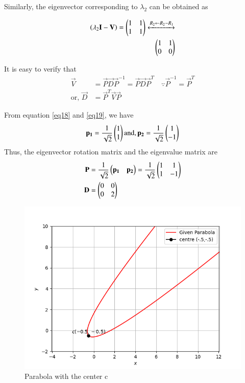 \documentclass[journal,12pt,twocolumn]{IEEEtran}
\begin{document}
  Similarly, the eigenvector corresponding to $\lambda_2$ can be obtained as
  
  \begin{align}
  \left(\lambda_2\mathbf{I}-\mathbf{V}\right)
  = \begin{pmatrix} 1 & 1 \\ 1 & 1\end{pmatrix} 
  \xleftrightarrow{R_2\leftarrow R_2 - R_1} \nonumber   \\
  \begin{pmatrix}
  	1 & 1   \\ 0 & 0 
  \end{pmatrix}
  \label{eq19}
  \end{align}
  
  
  

It is easy to verify that 
\begin{align}
\vec{V} &= \vec{P}\vec{D}\vec{P}^{-1}=\vec{P}\vec{D}\vec{P}^T \quad \because \vec{P}^{-1} = \vec{P}^{T} \label{eq:solutions/41/ex1/ellipse_spectrum_eq}
\\
\text{or, } \vec{D} &= \vec{P}^T\vec{V}\vec{P}
\end{align}


From equation \eqref{eq18} and \eqref{eq19}, we have
\begin{align}
\mathbf{p_1} =  \frac{1}{\sqrt{2}} \begin{pmatrix}1 \\ 1\end{pmatrix} 
\text{and},  \mathbf{p_2} =  \frac{1}{\sqrt{2}} \begin{pmatrix}1 \\ -1\end{pmatrix} 
\end{align}
Thus, the eigenvector rotation matrix and the
eigenvalue matrix are 
\begin{align}
\mathbf{P} &= \frac{1}{\sqrt{2}} \begin{pmatrix} \mathbf{p_1} & \mathbf{p_2}\end{pmatrix} = \frac{1}{\sqrt{2}} \begin{pmatrix} 1 & 1 \\ 1 & -1\end{pmatrix} \\
 \mathbf{D} &= \begin{pmatrix}0 & 0 \\ 0 & 2\end{pmatrix} 
\end{align}

\begin{figure}[htb!]	
	\centering	
	\includegraphics[width=\columnwidth]{parabola.png}	
	\caption{Parabola with the center c}
	\label{fig1}	
\end{figure}
\end{document}
